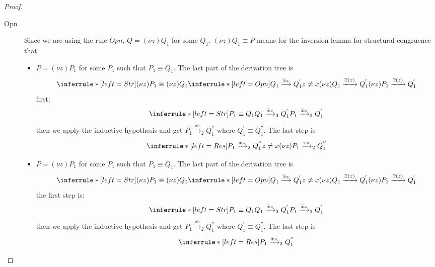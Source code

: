 \begin{theorem}
\begin{proof}
\begin{description}
\begin{description}
\begin{itemize}
\begin{description}
		  \item[Opn]
		    Since we are using the rule $Opn$, $Q=(\nu z) Q_{1}$ for some $Q_{1}$. $(\nu z) Q_{1}\equiv P$ means for the inversion lemma for structural congruence that
		    \begin{itemize}
		      \item
			$P=(\nu z) P_{1}$ for some $P_{1}$ such that $P_{1}\equiv Q_{1}$. The last part of the derivation tree is 
			\[
			  \inferrule* [left=Str]{
			      (\nu z) P_{1}\equiv (\nu z) Q_{1}
			    \\
			      \inferrule* [left=Opn]{
				  Q_{1} \xrightarrow{\overline{x}z} Q_{1}^{'}
				\\
				  z\neq x
			      }{
				(\nu z) Q_{1} \xrightarrow{\overline{x}(z)} Q_{1}^{'}
			      }
			  }{
			    (\nu z) P_{1} \xrightarrow{\overline{x}(z)} Q_{1}^{'}
			  }
			\]
			first:
			\[
			      \inferrule* [left=Str]{
				  P_{1}\equiv Q_{1}
				\\
				  Q_{1}\xrightarrow{\overline{x}z}_{3}Q_{1}^{'}
			      }{
				P_{1}\xrightarrow{\overline{x}z}_{3}Q_{1}^{'}
			      }
			\]
			then we apply the inductive hypothesis and get $P_{1}\xrightarrow{\overline{x}z}_{2}Q_{1}^{''}$ where $Q_{1}^{'}\equiv Q_{1}^{''}$. The last step is 
			\[
			  \inferrule* [left=Res]{
			      P_{1}\xrightarrow{\overline{x}z}_{2}Q_{1}^{''}
			    \\
			      z\neq x
			  }{
			    (\nu z)P_{1}\xrightarrow{\overline{x}z}_{2}Q_{1}^{''}
			  }
			\]
		      \item
			$P=(\nu z) P_{1}$ for some $P_{1}$ such that $P_{1}\equiv Q_{1}$. The last part of the derivation tree is 
			\[
			  \inferrule* [left=Str]{
			      (\nu z) P_{1}\equiv (\nu z) Q_{1}
			    \\
			      \inferrule* [left=Opn]{
				  Q_{1} \xrightarrow{\overline{x}z} Q_{1}^{'}
				\\
				  z\neq x
			      }{
				(\nu z) Q_{1} \xrightarrow{\overline{x}(z)} Q_{1}^{'}
			      }
			  }{
			    (\nu z) P_{1} \xrightarrow{\overline{x}(z)} Q_{1}^{'}
			  }
			\]
			the first step is:
			\[
			      \inferrule* [left=Str]{
				  P_{1}\equiv Q_{1}
				\\
				  Q_{1}\xrightarrow{\overline{x}z}_{3}Q_{1}^{'}
			      }{
				P_{1}\xrightarrow{\overline{x}z}_{3}Q_{1}^{'}
			      }
			\]
			then we apply the inductive hypothesis and get $P_{1}\xrightarrow{\overline{x}z}_{2}Q_{1}^{''}$ where $Q_{1}^{'}\equiv Q_{1}^{''}$. The last step is 
			\[
			  \inferrule* [left=Res]{
			      P_{1}\xrightarrow{\overline{x}z}_{2}Q_{1}^{''}
}\]
\end{itemize}
\end{description}
\end{itemize}
\end{description}
\end{description}
\end{proof}
\end{theorem}
